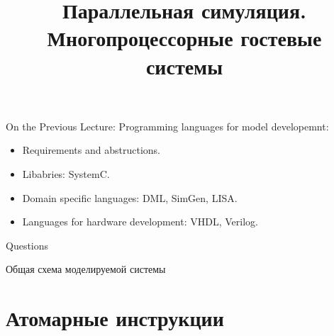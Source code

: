 

\title{Параллельная симуляция. Многопроцессорные гостевые системы}



\startslides

\begin{frame}{On the Previous Lecture:}
  Programming languages for model developemnt:
  \begin{itemize}
    \item Requirements and abstructions.
    \item Libabries: SystemC.
    \item Domain specific languages: DML, SimGen, LISA.
    \item Languages for hardware development: VHDL, Verilog.
  \end{itemize}
\end{frame}

\begin{frame}{Questions}
\end{frame}

\begin{frame}{Общая схема моделируемой системы}

\centering

    
\end{frame}


\section{Атомарные инструкции}

